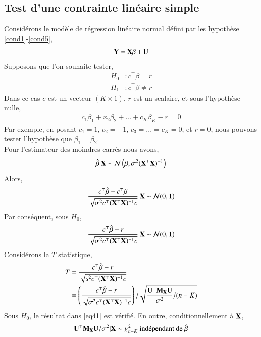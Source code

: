 \documentclass[10pt, reqno]{amsart}
\begin{document}
\subsection{Test d'une contrainte linéaire simple}
Considérons le modèle de régression linéaire normal défini par les hypothèse \ref{cond1}-\ref{cond5},
\begin{align*}
\mathbf Y = \mathbf X\beta + \mathbf U
\end{align*}
Supposons que l'on souhaite tester,
\begin{align*}
H_0&: c^\top\beta=r\\
H_1&: c^\top\beta \neq r
\end{align*}
Dans ce cas $c$ est un vecteur $(K\times 1)$, $r$ est un scalaire, et sous l'hypothèse nulle,
\begin{align*}
c_1\beta_1 + x_2\beta_2+...+c_K\beta_K-r=0
\end{align*}
Par exemple, en posant $c_1 = 1$, $c_2=-1$, $c_3 = ...=c_K = 0$, et $r = 0$, nous pouvons tester l'hypothèse que $\beta_1=\beta_2$.\\
Pour l'estimateur des moindres carrés nous avons,
\begin{align}
\hat{\beta}|\mathbf X \sim \mathcal{N}\left(\beta, \sigma^2(\mathbf X^\top\mathbf X)^{-1}\right)
\label{eq39}
\end{align} 
Alors,
\begin{align}
\frac{c^\top\hat{\beta} - c^\top\beta}{\sqrt{\sigma^2c^\top(\mathbf X^\top\mathbf X)^{-1}c}}
| \mathbf X \sim \mathcal{N}(0, 1)
\label{eq40}
\end{align} 
Par conséquent, sous $H_0$,
\begin{align}
\frac{c^\top\hat{\beta} - r}
{\sqrt{\sigma^2c^\top(\mathbf X^\top\mathbf X)^{-1}c}}
| \mathbf X \sim \mathcal{N}(0, 1)
\label{eq41}
\end{align} 
Considérons la $T$ statistique,
\begin{align*}
T &= \frac{c^\top\hat{\beta} - r}
{\sqrt{s^2c^\top(\mathbf X^\top\mathbf X)^{-1}c}}\\
&=\left(
\frac{c^\top\hat{\beta} - r}
{\sqrt{\sigma^2c^\top(\mathbf X^\top\mathbf X)^{-1}c}}
\right)
/
\sqrt{\frac{\mathbf U^\top\mathbf M_\mathbf X\mathbf U}{\sigma^2}/(n-K)}
\end{align*}
Sous $H_0$, le résultat dans \eqref{eq41} est vérifié. En outre, conditionnellement à $\mathbf X$,
\begin{align}
\boldU^\top\boldM_\boldX\boldU/\sigma^2 | \boldX\sim \chi^2_{n-K} \ \textrm{indépendant de}  \ \hat{\beta} 
\label{eq42}
\end{align}
\end{document}

